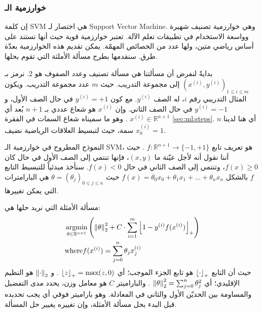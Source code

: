 \subsubsection{خوارزمية الـ }
إن كلمة \textenglish{SVM} هي اختصار لـ \textenglish{Support Vector Machine}.
وهي خوارزمية تصنيف شهيرة وواسعة الاستخدام في تطبيقات تعلم الآلة.
تعتبر خوارزمية قوية حيث أنها تستند على أساس رياضي متين، ولها عدد من الخصائص المهمّة.
يمكن تقديم هذه الخوارزمية بعدّة طرق.
سنقدمها بطرح مسألة الأملثة التي تقوم بحلها.

بدايةً لنفرض أن مسألتنا هي مسألة تصنيف وعدد الصفوف هو $2$.
نرمز بـ
$(x^{(i)}, y^{(i)})_{1 \leq i \leq m}$
إلى مجموعة التدريب.
حيث $m$ عدد مجموعة التدريب.
ويكون المثال التدريبي رقم $i$، له الصف $ y^{(i)} $.
مع كون $ y^{(i)} = +1 $ في حال الصف الأول، و $ y^{(i)} = -1 $ في حال الصف الثاني.
وإن $ x^{(i)} $ هو شعاع عددي بـ $ n+1 $ بُعد أي
$ x^{(i)} \in \mathbb{R}^{n+1} $%
. وهو ما سميناه شعاع السمات في الفقرة \ref{sec:ml:steps}.
أي هنا لدينا $n$ سمة، حيث لتبسيط العلاقات الرياضية نضيف $ x^{(i)}_0 = 1 $.

النموذج المطروح في خوارزمية الـ \textenglish{SVM}، هو تعريف تابع 
$ f: \mathbb{R}^{n+1} \rightarrow \{-1, +1 \} $%
. حيث أننا نقول أنه لأجل عيّنة ما $ (x, y) $، فإنها تنتمي إلى الصف الأول في حال كان $ f(x) \geq 0 $،
وتنتمي إلى الصف الثاني في حال $ f(x) < 0 $.
سنأخذ مبدئياً للتبسيط التابع $f$ بالشكل
$ f(x) = \theta_0 x_0 + \theta_1 x_1 + \dots + \theta_n x_n $
حيث
$ \theta = (\theta_j)_{0 \leq j \leq n} $
هي البارامترات التي يمكن تغييرها.

مسألة الأمثلة التي نريد حلها هي:
\begin{align}
\label{eq:svm:primal}
&
\argmin_{\theta \in \mathbb{R}^{n+1} } \left(
\norm{\theta}^2 +
C \cdot \sum_{i = 1}^{m} \pospart{1 - y^{(i)} f(x^{(i)})}
\right)
\\
&
\mathrm{where}
f(x^{(i)}) = \sum_{j = 0}^{n} \theta_j x^{(i)}_j
\nonumber
\end{align}
حيث أن التابع
$\left\lfloor\cdot\right\rfloor_{+}$
هو تابع الجزء الموجب؛ أي
$ \left\lfloor z\right\rfloor_{+} = \max(z, 0) $%
. و
$ \left\lVert\cdot\right\rVert_{2} $
هو النظيم الإقليدي؛ أي
$ \left\lVert\theta\right\rVert_{2}^2 = \sum_{j=0}^{n} \theta_j^2 $%
. والباراميتر $C$ هو معامل وزن، يحدد مدى التفضيل والمساومة بين الحديّن الأول والثاني في المعادلة.
وهو باراميتر فوقي  أي يجب تحديده قبل البدء بحل مسألة الأمثلة، وإن تغييره يغيير حل المسألة.


